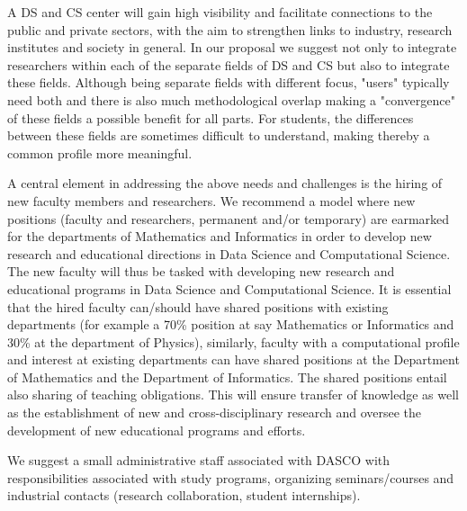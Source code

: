 \documentclass[a4paper,10pt]{article}
\begin{document}
A DS and CS center will gain high visibility and facilitate
connections to the public and private sectors, with the aim to
strengthen links to industry, research institutes and society in
general.  In our proposal we suggest not only to integrate researchers
within each of the separate fields of DS and CS but also to integrate
these fields. Although being separate fields with different focus,
"users" typically need both and there is also much methodological
overlap making a "convergence" of these fields a possible benefit for
all parts. For students, the differences between these fields are
sometimes difficult to understand, making thereby a common profile
more meaningful.


A central element in addressing the above needs and challenges is the
hiring of new faculty members and researchers. We recommend a model
where new positions (faculty and researchers, permanent and/or
temporary) are earmarked for the departments of Mathematics and
Informatics in order to develop new research and educational
directions in Data Science and Computational Science.  The new faculty
will thus be tasked with developing new research and educational
programs in Data Science and Computational Science. It is essential
that the hired faculty can/should have shared positions with existing
departments (for example a 70\% position at say Mathematics or
Informatics and 30\% at the department of Physics), similarly, faculty
with a computational profile and interest at existing departments can
have shared positions at the Department of Mathematics and the
Department of Informatics. The shared positions entail also sharing of
teaching obligations. This will ensure transfer of knowledge as well
as the establishment of new and cross-disciplinary research and
oversee the development of new educational programs and efforts.

We suggest a small administrative staff associated with DASCO with
responsibilities associated with study programs, organizing
seminars/courses and industrial contacts (research collaboration,
student internships).
\end{document}
